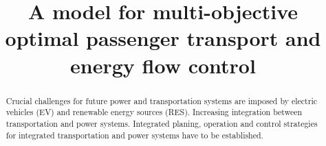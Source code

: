 \title{A model for multi-objective optimal passenger transport and energy flow control}

\author{
	\and
	\and
}

\maketitle

\begin{abstract}
	Crucial challenges for future power and transportation systems are imposed by electric vehicles (EV) and renewable energy sources (RES).	
	Increasing integration between transportation and power systems.
	Integrated planing, operation and control strategies for integrated transportation and power systems have to be established.
	
\end{abstract}

